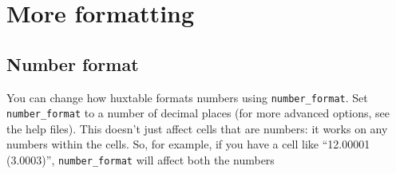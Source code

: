\documentclass[]{article}
\newenvironment{Shaded}{\begin{snugshade}}{\end{snugshade}}
\newcommand{\DecValTok}[1]{\textcolor[rgb]{0.00,0.00,0.81}{#1}}
\newcommand{\FloatTok}[1]{\textcolor[rgb]{0.00,0.00,0.81}{#1}}
\newcommand{\KeywordTok}[1]{\textcolor[rgb]{0.13,0.29,0.53}{\textbf{#1}}}
\newcommand{\NormalTok}[1]{#1}
\newcommand{\OperatorTok}[1]{\textcolor[rgb]{0.81,0.36,0.00}{\textbf{#1}}}
\newcommand{\StringTok}[1]{\textcolor[rgb]{0.31,0.60,0.02}{#1}}
\begin{document}
\FloatBarrier

\hypertarget{more-formatting}{%
\section{More formatting}\label{more-formatting}}

\hypertarget{number-format}{%
\subsection{Number format}\label{number-format}}

You can change how huxtable formats numbers using
\texttt{number\_format}. Set \texttt{number\_format} to a number of
decimal places (for more advanced options, see the help files). This
doesn't just affect cells that are numbers: it works on any numbers
within the cells. So, for example, if you have a cell like ``12.00001
(3.0003)'', \texttt{number\_format} will affect both the numbers

\begin{Shaded}
\end{Shaded}
\end{document}
